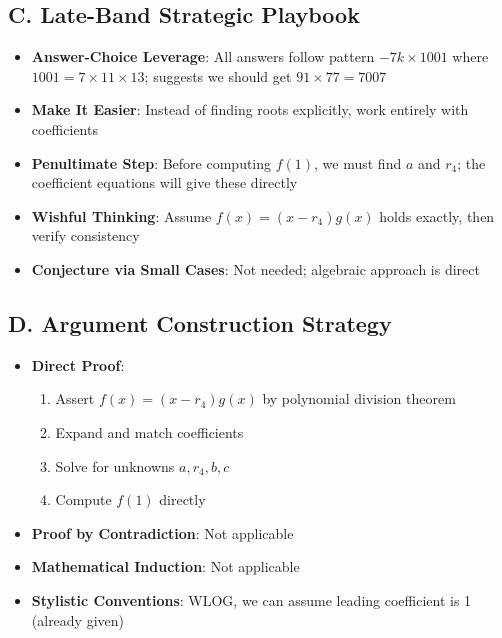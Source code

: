 \documentclass[]{article}
\begin{document}
\begin{strategicbox}
\subsection*{C. Late-Band Strategic Playbook}
\begin{itemize}[leftmargin=*]
    \item \textbf{Answer-Choice Leverage}: All answers follow pattern $-7k \times 1001$ where $1001 = 7 \times 11 \times 13$; suggests we should get $91 \times 77 = 7007$
    
    \item \textbf{Make It Easier}: Instead of finding roots explicitly, work entirely with coefficients
    
    \item \textbf{Penultimate Step}: Before computing $f(1)$, we must find $a$ and $r_4$; the coefficient equations will give these directly
    
    \item \textbf{Wishful Thinking}: Assume $f(x) = (x-r_4)g(x)$ holds exactly, then verify consistency
    
    \item \textbf{Conjecture via Small Cases}: Not needed; algebraic approach is direct
\end{itemize}

\subsection*{D. Argument Construction Strategy}
\begin{itemize}[leftmargin=*]
    \item \textbf{Direct Proof}: 
    \begin{enumerate}
        \item Assert $f(x) = (x-r_4)g(x)$ by polynomial division theorem
        \item Expand and match coefficients
        \item Solve for unknowns $a, r_4, b, c$
        \item Compute $f(1)$ directly
    \end{enumerate}
    
    \item \textbf{Proof by Contradiction}: Not applicable
    
    \item \textbf{Mathematical Induction}: Not applicable
    
    \item \textbf{Stylistic Conventions}: WLOG, we can assume leading coefficient is 1 (already given)
\end{itemize}


\end{strategicbox}
\end{document}
